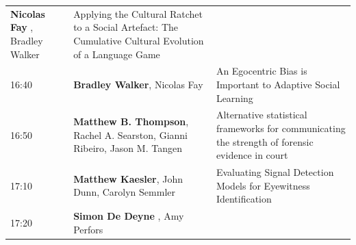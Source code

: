 \documentclass[]{article}
\begin{document}
\begin{longtable}[]{@{}lll@{}}
\begin{minipage}[t]{0.39\columnwidth}
\textbf{Nicolas Fay} , Bradley Walker\strut
\end{minipage} & \begin{minipage}[t]{0.50\columnwidth}\raggedright\strut
Applying the Cultural Ratchet to a Social Artefact: The Cumulative
Cultural Evolution of a Language Game\strut
\end{minipage}\tabularnewline
\begin{minipage}[t]{0.03\columnwidth}\raggedright\strut
16:40\strut
\end{minipage} & \begin{minipage}[t]{0.39\columnwidth}\raggedright\strut
\textbf{Bradley Walker}, Nicolas Fay\strut
\end{minipage} & \begin{minipage}[t]{0.50\columnwidth}\raggedright\strut
An Egocentric Bias is Important to Adaptive Social Learning\strut
\end{minipage}\tabularnewline
\begin{minipage}[t]{0.03\columnwidth}\raggedright\strut
16:50\strut
\end{minipage} & \begin{minipage}[t]{0.39\columnwidth}\raggedright\strut
\textbf{Matthew B. Thompson}, Rachel A. Searston, Gianni Ribeiro, Jason
M. Tangen\strut
\end{minipage} & \begin{minipage}[t]{0.50\columnwidth}\raggedright\strut
Alternative statistical frameworks for communicating the strength of
forensic evidence in court\strut
\end{minipage}\tabularnewline
\begin{minipage}[t]{0.03\columnwidth}\raggedright\strut
17:10\strut
\end{minipage} & \begin{minipage}[t]{0.39\columnwidth}\raggedright\strut
\textbf{Matthew Kaesler}, John Dunn, Carolyn Semmler\strut
\end{minipage} & \begin{minipage}[t]{0.50\columnwidth}\raggedright\strut
Evaluating Signal Detection Models for Eyewitness Identification\strut
\end{minipage}\tabularnewline
\begin{minipage}[t]{0.03\columnwidth}\raggedright\strut
17:20\strut
\end{minipage} & \begin{minipage}[t]{0.39\columnwidth}\raggedright\strut
\textbf{Simon De Deyne} , Amy Perfors\strut
\end{minipage} & \begin{minipage}[t]{0.50\columnwidth}\raggedright\strut

\end{minipage}
\end{longtable}
\end{document}
